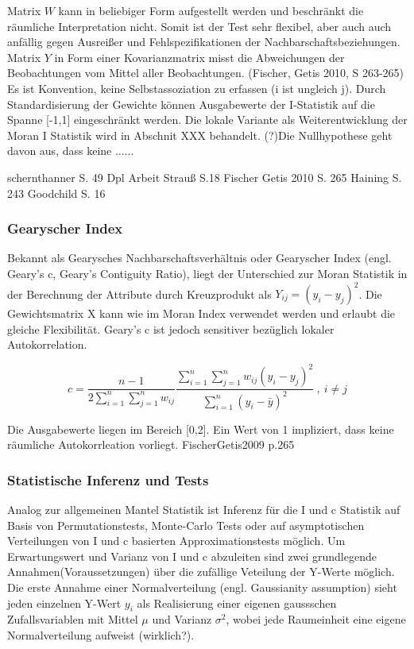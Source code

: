 Matrix $W$ kann in beliebiger Form aufgestellt werden und beschränkt die räumliche Interpretation nicht. 
Somit ist der Test sehr flexibel, aber auch auch anfällig gegen Ausreißer und Fehlspezifikationen der Nachbarschaftsbeziehungen. 
Matrix $Y$ in Form einer Kovarianzmatrix misst die Abweichungen der Beobachtungen vom Mittel aller Beobachtungen.
(Fischer, Getis 2010, S 263-265)
Es ist Konvention, keine Selbstassoziation zu erfassen (i ist ungleich j). 
Durch Standardisierung der Gewichte können Ausgabewerte der I-Statistik auf die Spanne [-1,1] eingeschränkt werden. 
Die lokale Variante als Weiterentwicklung der Moran I Statistik wird in Abschnit XXX behandelt.
(?)Die Nullhypothese geht davon aus, dass keine  ......

schernthanner S. 49
Dpl Arbeit Strauß S.18
Fischer Getis 2010 S. 265
Haining S. 243
Goodchild S. 16

\subsubsection{Gearyscher Index}

Bekannt als Gearysches Nachbarschaftsverhältnis oder Gearyscher Index (engl. Geary’s c, Geary's Contiguity Ratio), 
liegt der Unterschied zur Moran Statistik in der Berechnung der Attribute durch Kreuzprodukt als $Y_{ij}=\left(y_i-y_j\right)^2$. 
Die Gewichtsmatrix X kann wie im Moran Index verwendet werden und erlaubt die gleiche Flexibilität. Geary's c ist jedoch sensitiver bezüglich lokaler Autokorrelation.

\begin{equation}
    c=\frac{n-1} {2 \sum_{i=1}^{n} \sum_{j=1}^{n} w_{ij}} 
        \frac{\sum_{i=1}^{n}\sum_{j=1}^{n} {w_{ij} \left(y_i-y_j\right)^2}} 
        {\sum_{i=1}^{n}\left(y_i-\bar{y}\right)^2} ~, ~ i\neq j
\end{equation}

Die Ausgabewerte liegen im Bereich [0,2]. Ein Wert von 1 impliziert, dass keine räumliche Autokorrleation vorliegt.
FischerGetis2009 p.265

\subsubsection{Statistische Inferenz und Tests}

Analog zur allgemeinen Mantel Statistik ist Inferenz für die I und c Statistik auf Basis von Permutationstests, 
Monte-Carlo Tests oder auf asymptotischen Verteilungen von I und c basierten Approximationstests möglich. 
Um Erwartungswert und Varianz von I und c abzuleiten sind zwei grundlegende Annahmen(Voraussetzungen) über die 
zufällige Veteilung der Y-Werte möglich. 
Die erste Annahme einer Normalverteilung (engl. Gaussianity assumption) sieht jeden einzelnen Y-Wert $y_i$ 
als Realisierung einer eigenen gaussschen Zufallsvariablen mit Mittel $\mu$ und Varianz $\sigma^2$, 
wobei jede Raumeinheit eine eigene Normalverteilung aufweist (wirklich?). 

